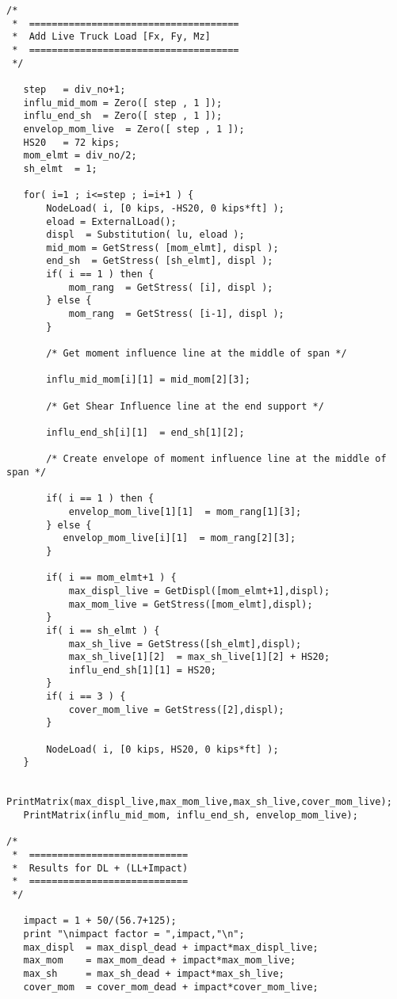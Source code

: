 \begin{footnotesize}
\begin{verbatim}
/* 
 *  =====================================
 *  Add Live Truck Load [Fx, Fy, Mz] 
 *  =====================================
 */ 

   step   = div_no+1;
   influ_mid_mom = Zero([ step , 1 ]);
   influ_end_sh  = Zero([ step , 1 ]);
   envelop_mom_live  = Zero([ step , 1 ]);
   HS20   = 72 kips;
   mom_elmt = div_no/2;
   sh_elmt  = 1;

   for( i=1 ; i<=step ; i=i+1 ) {
       NodeLoad( i, [0 kips, -HS20, 0 kips*ft] );
       eload = ExternalLoad();
       displ  = Substitution( lu, eload );
       mid_mom = GetStress( [mom_elmt], displ );
       end_sh  = GetStress( [sh_elmt], displ );
       if( i == 1 ) then {
           mom_rang  = GetStress( [i], displ );
       } else {
           mom_rang  = GetStress( [i-1], displ );
       }

       /* Get moment influence line at the middle of span */

       influ_mid_mom[i][1] = mid_mom[2][3];

       /* Get Shear Influence line at the end support */

       influ_end_sh[i][1]  = end_sh[1][2];

       /* Create envelope of moment influence line at the middle of span */

       if( i == 1 ) then { 
           envelop_mom_live[1][1]  = mom_rang[1][3];
       } else {
          envelop_mom_live[i][1]  = mom_rang[2][3];
       }

       if( i == mom_elmt+1 ) {
           max_displ_live = GetDispl([mom_elmt+1],displ);
           max_mom_live = GetStress([mom_elmt],displ);
       }
       if( i == sh_elmt ) {
           max_sh_live = GetStress([sh_elmt],displ);
           max_sh_live[1][2]  = max_sh_live[1][2] + HS20;
           influ_end_sh[1][1] = HS20;
       }
       if( i == 3 ) {
           cover_mom_live = GetStress([2],displ);
       }

       NodeLoad( i, [0 kips, HS20, 0 kips*ft] );
   }

   PrintMatrix(max_displ_live,max_mom_live,max_sh_live,cover_mom_live);
   PrintMatrix(influ_mid_mom, influ_end_sh, envelop_mom_live);

/* 
 *  ============================
 *  Results for DL + (LL+Impact)
 *  ============================
 */ 

   impact = 1 + 50/(56.7+125);
   print "\nimpact factor = ",impact,"\n";
   max_displ  = max_displ_dead + impact*max_displ_live;
   max_mom    = max_mom_dead + impact*max_mom_live;
   max_sh     = max_sh_dead + impact*max_sh_live;
   cover_mom  = cover_mom_dead + impact*cover_mom_live;


\end{verbatim}
\end{footnotesize}

